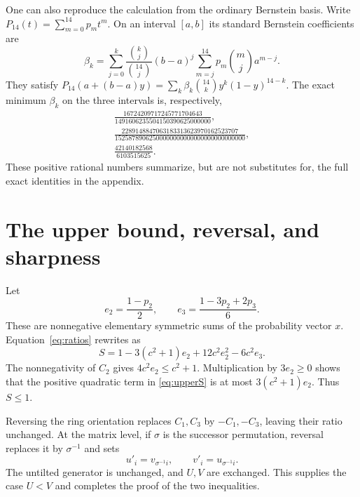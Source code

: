 \documentclass[11pt,a4paper]{article}
\numberwithin{equation}{section}
\theoremstyle{remark}
\begin{document}
One can also reproduce the calculation from the ordinary Bernstein basis.
Write $P_{14}(t)=\sum_{m=0}^{14}p_mt^m$. On an interval $[a,b]$ its standard
Bernstein coefficients are
\begin{equation}\label{eq:Bernstein}
 \beta_k=\sum_{j=0}^k\frac{\binom{k}{j}}{\binom{14}{j}}(b-a)^j
             \sum_{m=j}^{14}p_m\binom{m}{j}a^{m-j}.
\end{equation}
They satisfy
$P_{14}(a+(b-a)y)=\sum_k\beta_k\binom{14}{k}y^k(1-y)^{14-k}$.
The exact minimum $\beta_k$ on the three intervals is, respectively,
\begin{gather*}
 \frac{16724209717245771704643}{1491606235504150390625000000},\\[3pt]
 \frac{2289148847063183313623970162523707}
      {15258789062500000000000000000000000000},\\[3pt]
 \frac{42140182568}{6103515625}.
\end{gather*}
These positive rational numbers summarize, but are not substitutes for,
the full exact identities in the appendix.

\section{The upper bound, reversal, and sharpness}\label{sec:upper}

Let
\[
 e_2=\frac{1-p_2}{2},\qquad e_3=\frac{1-3p_2+2p_3}{6}.
\]
These are nonnegative elementary symmetric sums of the probability vector
$x$. Equation~\eqref{eq:ratios} rewrites as
\begin{equation}\label{eq:upperS}
  S=1-3(c^2+1)e_2+12c^2e_2^2-6c^2e_3.
\end{equation}
The nonnegativity of $C_2$ gives $4c^2e_2\le c^2+1$. Multiplication by
$3e_2\ge0$ shows that the positive quadratic term in \eqref{eq:upperS} is
at most $3(c^2+1)e_2$. Thus $S\le1$.

Reversing the ring orientation replaces $C_1,C_3$ by $-C_1,-C_3$, leaving
their ratio unchanged. At the matrix level, if $\sigma$ is the successor
permutation, reversal replaces it by $\sigma^{-1}$ and sets
\[
 u'_i=v_{\sigma^{-1}i},\qquad v'_i=u_{\sigma^{-1}i}.
\]
The untilted generator is unchanged, and $U,V$ are exchanged. This supplies
the case $U<V$ and completes the proof of the two inequalities.
\end{document}
